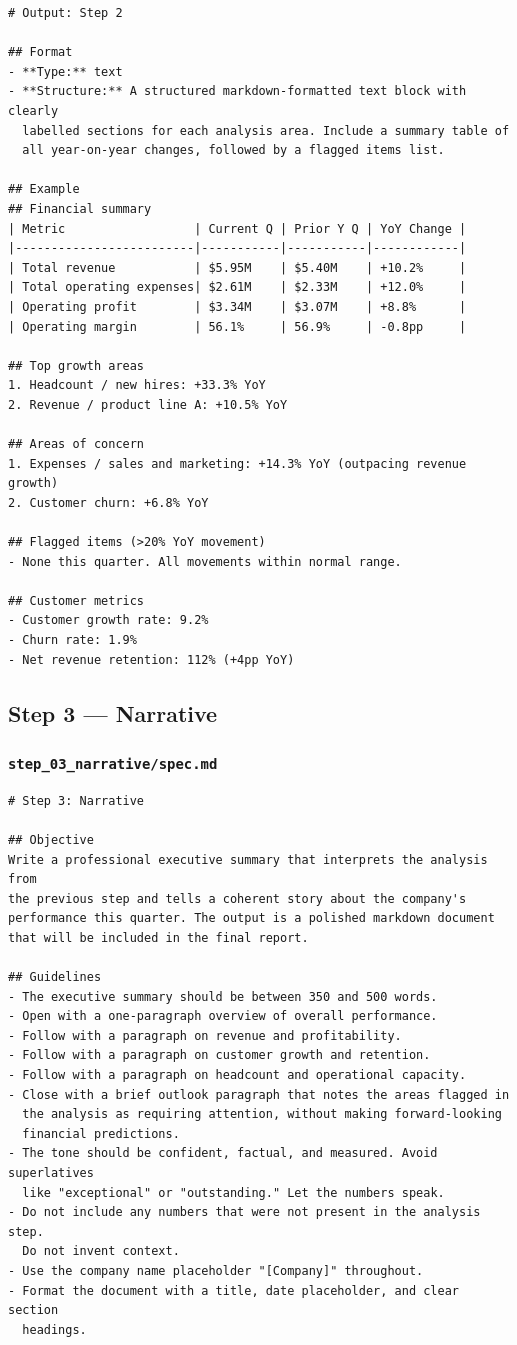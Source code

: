 \documentclass[12pt, a4paper]{article}
\begin{document}
\begin{lstlisting}[language={}]
# Output: Step 2

## Format
- **Type:** text
- **Structure:** A structured markdown-formatted text block with clearly
  labelled sections for each analysis area. Include a summary table of
  all year-on-year changes, followed by a flagged items list.

## Example
## Financial summary
| Metric                  | Current Q | Prior Y Q | YoY Change |
|-------------------------|-----------|-----------|------------|
| Total revenue           | $5.95M    | $5.40M    | +10.2%     |
| Total operating expenses| $2.61M    | $2.33M    | +12.0%     |
| Operating profit        | $3.34M    | $3.07M    | +8.8%      |
| Operating margin        | 56.1%     | 56.9%     | -0.8pp     |

## Top growth areas
1. Headcount / new hires: +33.3% YoY
2. Revenue / product line A: +10.5% YoY

## Areas of concern
1. Expenses / sales and marketing: +14.3% YoY (outpacing revenue growth)
2. Customer churn: +6.8% YoY

## Flagged items (>20% YoY movement)
- None this quarter. All movements within normal range.

## Customer metrics
- Customer growth rate: 9.2%
- Churn rate: 1.9%
- Net revenue retention: 112% (+4pp YoY)
\end{lstlisting}

\subsection{Step 3 — Narrative}

\subsubsection{\texttt{step\_03\_narrative/spec.md}}

\begin{lstlisting}[language={}]
# Step 3: Narrative

## Objective
Write a professional executive summary that interprets the analysis from
the previous step and tells a coherent story about the company's
performance this quarter. The output is a polished markdown document
that will be included in the final report.

## Guidelines
- The executive summary should be between 350 and 500 words.
- Open with a one-paragraph overview of overall performance.
- Follow with a paragraph on revenue and profitability.
- Follow with a paragraph on customer growth and retention.
- Follow with a paragraph on headcount and operational capacity.
- Close with a brief outlook paragraph that notes the areas flagged in
  the analysis as requiring attention, without making forward-looking
  financial predictions.
- The tone should be confident, factual, and measured. Avoid superlatives
  like "exceptional" or "outstanding." Let the numbers speak.
- Do not include any numbers that were not present in the analysis step.
  Do not invent context.
- Use the company name placeholder "[Company]" throughout.
- Format the document with a title, date placeholder, and clear section
  headings.
\end{lstlisting}
\end{document}
